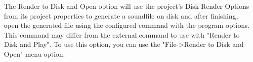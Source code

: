 The Render to Disk and Open option will use the project's Disk Render
Options from its project properties to generate a soundfile on disk and
after finishing, open the generated file using the configured command
with the program options. This command may differ from the external
command to use with "Render to Disk and Play". To use this option, you
can use the "File-\textgreater{}Render to Disk and Open" menu option.
